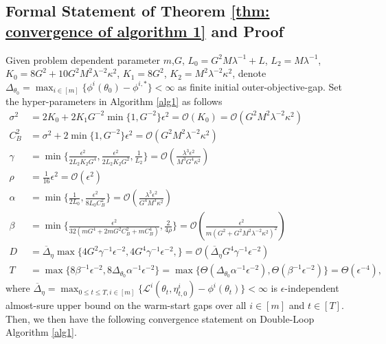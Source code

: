 \documentclass[twoside]{article} %
\theoremstyle{plain}
\theoremstyle{definition}
\theoremstyle{remark}
\newcommand{\fL}{\mathcal{L}}
\begin{document}
\subsection{Formal Statement of Theorem \ref{thm: convergence of algorithm 1} and Proof}\label{Appendix: proof of convergence algorithm 1}
Given problem dependent parameter $m$,$G$, $L_0=G^2M\lambda^{-1}+L$, $L_2=M\lambda^{-1}$, $K_0=8G^2+10G^2M^2\lambda^{-2}\kappa^2$, $K_1=8G^2$, $K_2=M^2\lambda^{-2}\kappa^2$, denote $\Delta_{\theta_0} = \max_{i\in[m]}\{\phi^i(\theta_0)-\phi^{i,*}\}<\infty$ as finite initial outer-objective-gap.
Set the hyper-parameters in Algorithm \ref{alg1} as follows
\begin{align}
    \sigma^2 &= {2K_0}+{2K_1G^{-2}}\min\{1,G^{-2}\}\epsilon^2 =\mathcal{O}(K_0)=\mathcal{O}(G^2M^2\lambda^{-2}\kappa^2)\nonumber\\
    C_B^2&=\sigma^2+2\min\{1,G^{-2}\}\epsilon^2 = \mathcal{O}(G^2M^2\lambda^{-2}\kappa^2)\nonumber\\
    \gamma&= \min\{\frac{\epsilon^2}{2L_2K_2G^4},\frac{\epsilon^2}{2L_2K_2G^2},\frac{1}{L_2} \}=\mathcal{O}(\frac{\lambda^3\epsilon^2}{M^3G^4\kappa^2})
    \nonumber\\
    \rho&= \frac{1}{16}\epsilon^2=\mathcal{O}(\epsilon^2) \nonumber\\
    \alpha&= \min\Big\{\frac{1}{2L_0},\frac{\epsilon^2}{8L_0C_B^2}\Big\} = \mathcal{O}(\frac{\lambda^{3}\epsilon^2}{G^4M^3\kappa^2}) \nonumber\\
    \beta&= \min \Big\{\frac{\epsilon^2}{32(mG^4+2mG^2C_B^2+mC_B^4)},\frac{2}{4\rho}\Big\}= \mathcal{O}(\frac{\epsilon^2}{m(G^2+G^2M^2\lambda^{-2}\kappa^2)^2})
    \nonumber\\
    D&= \overline{\Delta}_{\eta}\max\{4G^2\gamma^{-1}\epsilon^{-2}, 4G^4\gamma^{-1}\epsilon^{-2}, \} = \mathcal{O}( \overline{\Delta}_{\eta}G^4\gamma^{-1}\epsilon^{-2})\nonumber\\
    T&=\max\Big\{ {8}\beta^{-1}\epsilon^{-2}, 8\Delta_{\theta_0}\alpha^{-1}\epsilon^{-2}\Big\}=\max\Big\{\Theta(\Delta_{\theta_0}\alpha^{-1}\epsilon^{-2}), \Theta(\beta^{-1}\epsilon^{-2})\Big\}=\Theta(\epsilon^{-4}),
\end{align}
where
$\overline{\Delta}_{\eta}= \max_{0\leq t\leq T, i\in[m]}\big \{\fL^i({\theta}_t,\eta^i_{t,0})-\phi^i({\theta_t})\}<\infty$ is $\epsilon$-independent almost-sure upper bound on the warm-start gaps over all $i\in[m]$ and $t\in [T]$.
Then, we then have the following convergence statement on Double-Loop Algorithm \ref{alg1}.
\end{document}
